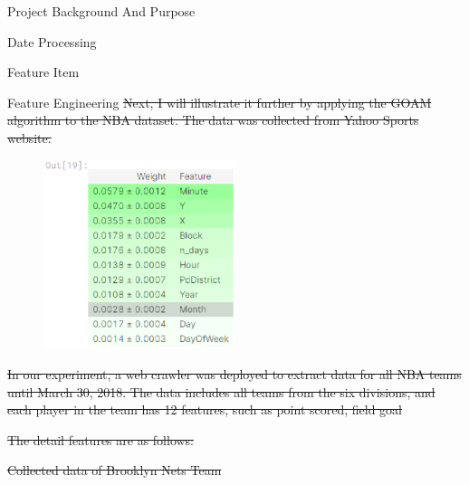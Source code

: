\documentclass[
 size=14pt,
 paper=smartboard,  %
 mode=present, 		%
 display=slides, 	%
 style=tuliplab,  	%
 pauseslide,
 fleqn,leqno]{powerdot}
\providecommand{\DIFdeltex}[1]{{\protect\color{red}\sout{#1}}}                      %
\providecommand{\DIFaddbegin}{} %
\providecommand{\DIFaddend}{} %
\providecommand{\DIFdelbegin}{} %
\providecommand{\DIFdelend}{} %
\providecommand{\DIFdelFL}[1]{\DIFdel{#1}} %
\providecommand{\DIFdel}[1]{\texorpdfstring{\DIFdeltex{#1}}{}} %
\newcommand{\DIFscaledelfig}{0.5}
\newlength{\DIFdelgraphicswidth} %
\newlength{\DIFdelgraphicsheight} %
\newcommand{\DIFaddincludegraphics}[2][]{{\color{blue}\fbox{\DIFOincludegraphics[#1]{#2}}}} %
\newcommand{\DIFdelincludegraphics}[2][]{%
\sbox{\DIFdelgraphicsbox}{\DIFOincludegraphics[#1]{#2}}%
\settoboxwidth{\DIFdelgraphicswidth}{\DIFdelgraphicsbox} %
\settoboxtotalheight{\DIFdelgraphicsheight}{\DIFdelgraphicsbox} %
\scalebox{\DIFscaledelfig}{%
\parbox[b]{\DIFdelgraphicswidth}{\usebox{\DIFdelgraphicsbox}\\[-\baselineskip] \rule{\DIFdelgraphicswidth}{0em}}\llap{\resizebox{\DIFdelgraphicswidth}{\DIFdelgraphicsheight}{%
\setlength{\unitlength}{\DIFdelgraphicswidth}%
\begin{picture}(1,1)%
\thicklines\linethickness{2pt} %
{\color[rgb]{1,0,0}\put(0,0){\framebox(1,1){}}}%
{\color[rgb]{1,0,0}\put(0,0){\line( 1,1){1}}}%
{\color[rgb]{1,0,0}\put(0,1){\line(1,-1){1}}}%
\end{picture}%
}\hspace*{3pt}}} %
} %
\DeclareRobustCommand{\DIFaddbegin}{\DIFOaddbegin \let\includegraphics\DIFaddincludegraphics} %
\DeclareRobustCommand{\DIFaddend}{\DIFOaddend \let\includegraphics\DIFOincludegraphics} %
\DeclareRobustCommand{\DIFdelbegin}{\DIFOdelbegin \let\includegraphics\DIFdelincludegraphics} %
\DeclareRobustCommand{\DIFdelend}{\DIFOaddend \let\includegraphics\DIFOincludegraphics} %
\begin{document}
\begin{slide}
\begin{slide}{Project Background And Purpose}
\begin{slide}{Date Processing}
\begin{slide}{Feature Item}
\begin{slide}{Feature Engineering}
\DIFdelbegin %
\DIFdel{Next, I will illustrate it further by applying the GOAM algorithm to the NBA dataset.
The data was collected from Yahoo Sports website.
}\DIFdelend \DIFaddbegin \begin{figure}
  \centering
  \includegraphics[width=0.5\textwidth]{kaggle/14.eps}
\end{figure}
  \DIFaddend 

\DIFdelbegin \DIFdel{In our experiment, a web crawler was deployed to extract data
for all NBA teams until March 30, 2018.
The data includes all teams from the six divisions, and each player in the
   team has 12 features, such as point scored, field goal}%

\DIFdelend \end{slide}


\DIFdelbegin %
\DIFdel{The detail features are as follows:
}\DIFdelend %




\DIFdelbegin %
{%
\DIFdelFL{Collected data of Brooklyn Nets Team}}


\end{slide}
\end{slide}
\end{slide}
\end{slide}
\end{document}

